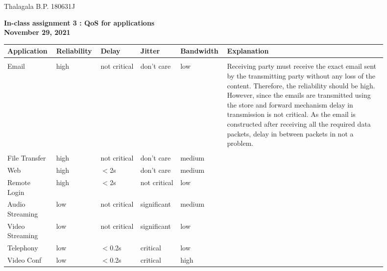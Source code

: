 \documentclass[a4paper,11pt]{article}
\begin{document}
\begin{landscape}

	Thalagala B.P. 180631J
\begin{center}
{	\Large\textbf{In-class assignment 3 : QoS for applications}}\\[2mm]

\textbf{November 29, 2021}
\end{center}

\begin{table}[!h]
	\begin{tabular}{p{0.1\linewidth} | p{0.1\linewidth} | p{0.1\linewidth} | p{0.1\linewidth} | p{0.1\linewidth} | p{0.4\linewidth} } 
	\textbf{Application}& \textbf{Reliability} & \textbf{Delay}& \textbf{Jitter} &\textbf{Bandwidth} & \textbf{Explanation} \\\hline
	&&&&&\\
	Email 	& high 		& not critical 	& don't care & low	&Receiving party must receive the  exact email sent by the transmitting party without any loss of the content. Therefore, the reliability should be high. However, since the emails are transmitted using the store and forward mechanism delay in transmission is not critical. As the email is constructed after receiving all the required data packets, delay in between packets in not a problem. \\\hline
	&&&&&\\
	
	File Transfer& high & not critical 	& don't care & medium	& \\
	Web &high	& $<$2s & don't care & medium & \\
	Remote Login& high	& $<$2s & not critical & low & \\
	Audio Streaming & low 	& not critical 	& significant & medium & \\
	Video Streaming	& low	& not critical 	& significant & low & \\
	Telephony	& low   & $<$0.2s & critical & low & \\
	Video Conf	& low  & $<$0.2s & critical & high & \\

	\end{tabular}
\end{table}

\end{landscape}
\end{document}
